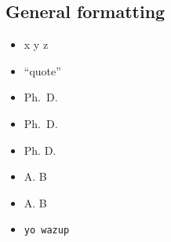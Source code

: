 \documentclass[a4paper,11pt]{article}
\begin{document}
  \subsection*{General formatting}
    \begin{itemize}[noitemsep]
      \item x  y  z 
      \item ``quote''
      \item Ph.~D.
      \item Ph.\ D.
      \item Ph. D.
      \item A. B
      \item A\@. B
      \item \verb*+yo wazup+
    \end{itemize}

  \newpage

  \setlength{}
  \renewcommand{\bibname}{Bibliography}
  
\end{document}
